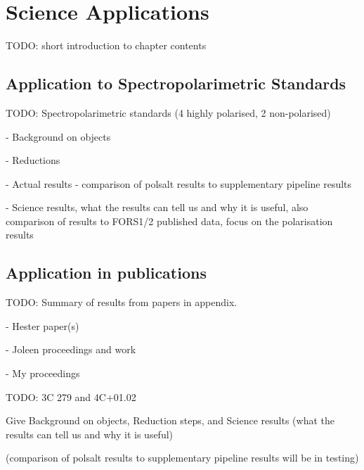 \chapter{Science Applications}

TODO: short introduction to chapter contents

\section{Application to Spectropolarimetric Standards}
TODO: Spectropolarimetric standards (4 highly polarised, 2 non-polarised)

- Background on objects

- Reductions

- Actual results - comparison of polsalt results to supplementary pipeline results

- Science results, what the results can tell us and why it is useful, also comparison of results to FORS1/2 published data, focus on the polarisation results

	
\section{Application in publications}

TODO: Summary of results from papers in appendix.

- Hester paper(s)

- Joleen proceedings and work

- My proceedings

TODO: 3C 279 and 4C+01.02

Give Background on objects, Reduction steps, and Science results (what the results can tell us and why it is useful)

(comparison of polsalt results to supplementary pipeline results will be in testing)